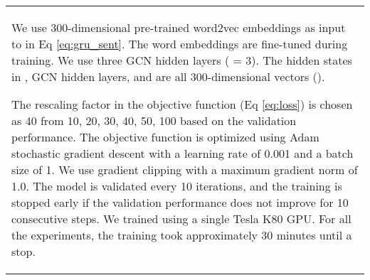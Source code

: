 \documentclass[11pt,a4paper]{article}
\begin{document}
\begin{table}[]
\begin{tabular}{l}
We use 300-dimensional pre-trained word2vec embeddings \cite{mikolov2013distributed} as input to  in Eq \ref{eq:gru_sent}.
The word embeddings are fine-tuned during training.
We use three GCN hidden layers ( = 3).
The hidden states in , GCN hidden layers, and  are all 300-dimensional vectors ().

The rescaling factor  in the objective function (Eq \ref{eq:loss}) is chosen as 40 from 10, 20, 30, 40, 50, 100 based on the validation performance.
The objective function is optimized using Adam \cite{kingma2015adam} stochastic gradient descent with a learning rate of 0.001 and a batch size of 1.
We use gradient clipping with a maximum gradient norm of 1.0.
The model is validated every 10 iterations, and
the training is stopped early if the validation performance does not improve for 10 consecutive steps.
We trained using a single Tesla K80 GPU. 
For all the experiments, the training took approximately 30 minutes until a stop.


\end{tabular}
\end{table}
\end{document}
